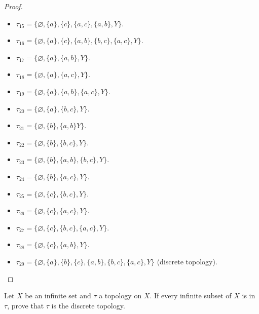\begin{proof}
\begin{enumerate}[label={(\alph*)}]
\begin{itemize}
			      \item $\tau_{15} = \{ \varnothing, \{ a \}, \{ c \}, \{ a, c \}, \{ a, b \}, Y \}$.
			      \item $\tau_{16} = \{ \varnothing, \{ a \}, \{ c \}, \{ a, b \}, \{ b, c \}, \{ a, c \}, Y \}$.
			      \item $\tau_{17} = \{ \varnothing, \{ a \}, \{ a, b \}, Y \}$.
			      \item $\tau_{18} = \{ \varnothing, \{ a \}, \{ a, c \}, Y \}$.
			      \item $\tau_{19} = \{ \varnothing, \{ a \}, \{ a, b \}, \{ a, c \}, Y \}$.
			      \item $\tau_{20} = \{ \varnothing, \{ a \}, \{ b, c \}, Y \}$.
			      \item $\tau_{21} = \{ \varnothing, \{ b \}, \{ a, b \} Y \}$.
			      \item $\tau_{22} = \{ \varnothing, \{ b \}, \{ b, c \}, Y \}$.
			      \item $\tau_{23} = \{ \varnothing, \{ b \}, \{ a, b \}, \{ b, c \}, Y \}$.
			      \item $\tau_{24} = \{ \varnothing, \{ b \}, \{ a, c \}, Y \}$.
			      \item $\tau_{25} = \{ \varnothing, \{ c \}, \{ b, c \}, Y \}$.
			      \item $\tau_{26} = \{ \varnothing, \{ c \}, \{ a, c \}, Y \}$.
			      \item $\tau_{27} = \{ \varnothing, \{ c \}, \{ b, c \}, \{ a, c \}, Y \}$.
			      \item $\tau_{28} = \{ \varnothing, \{ c \}, \{ a, b \}, Y \}$.
			      \item $\tau_{29} = \{ \varnothing, \{ a \}, \{ b \}, \{ c \}, \{ a, b \}, \{ b, c \}, \{ a, c \}, Y \}$ (discrete topology).
		      \end{itemize}
	\end{enumerate}
\end{proof}
\newpage

\begin{exercise}
	Let $X$ be an infinite set and $\tau$ a topology on $X$. If every infinite subset of $X$ is in $\tau$, prove that $\tau$ is the discrete topology.
\end{exercise}


